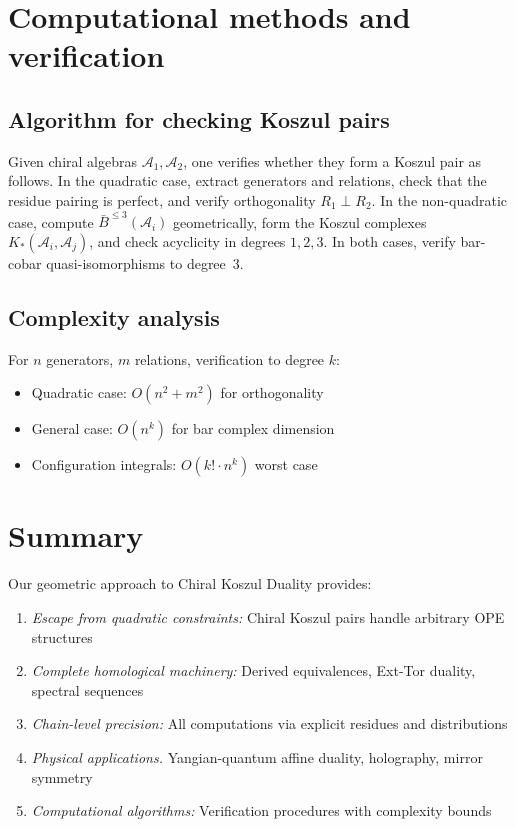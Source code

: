 \section{Computational methods and verification}

\subsection{Algorithm for checking Koszul pairs}

\begin{construction}\label{con:verify-koszul-pair}
Given chiral algebras $\mathcal{A}_1, \mathcal{A}_2$, one verifies whether they form a Koszul pair as follows.
In the quadratic case, extract generators and relations, check that the residue pairing is perfect, and verify orthogonality $R_1 \perp R_2$.
In the non-quadratic case, compute $\bar{B}^{\leq 3}(\mathcal{A}_i)$ geometrically, form the Koszul complexes $K_*(\mathcal{A}_i, \mathcal{A}_j)$, and check acyclicity in degrees $1,2,3$.
In both cases, verify bar-cobar quasi-isomorphisms to degree~$3$.
\end{construction}

\subsection{Complexity analysis}

For $n$ generators, $m$ relations, verification to degree $k$:
\begin{itemize}
\item Quadratic case: $O(n^2 + m^2)$ for orthogonality
\item General case: $O(n^k)$ for bar complex dimension
\item Configuration integrals: $O(k! \cdot n^k)$ worst case
\end{itemize}


\section{Summary}

Our geometric approach to Chiral Koszul Duality provides:

\begin{enumerate}
\item \emph{Escape from quadratic constraints:} Chiral Koszul pairs handle arbitrary OPE structures

\item \emph{Complete homological machinery:} Derived equivalences, Ext-Tor duality, spectral sequences

\item \emph{Chain-level precision:} All computations via explicit residues and distributions

\item \emph{Physical applications.} Yangian-quantum affine duality, holography, mirror symmetry

\item \emph{Computational algorithms:} Verification procedures with complexity bounds
\end{enumerate}

